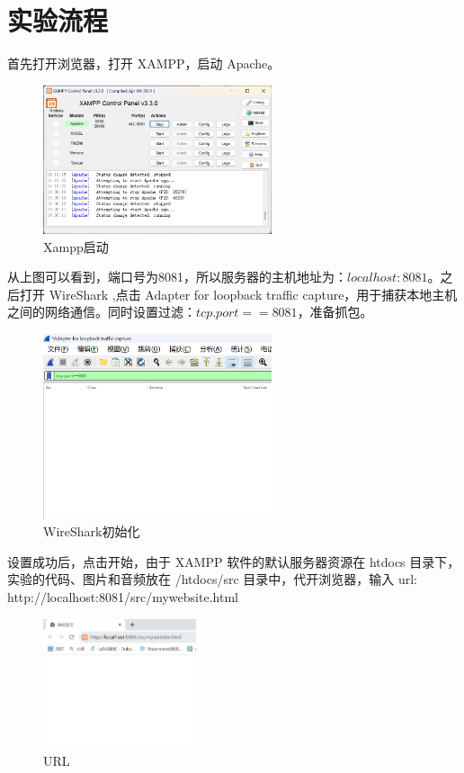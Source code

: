 \documentclass[UTF8,a4paper,10pt]{ctexart}
\begin{document}
\section{实验流程}
首先打开浏览器，打开 XAMPP，启动 Apache。
\begin{figure}[H]
    \centering
\includegraphics[width=0.6\textwidth]{img/Xampp启动.png}
    \caption{Xampp启动}
\end{figure}
从上图可以看到，端口号为8081，所以服务器的主机地址为：$localhost:8081$。之后打开 WireShark ,点击 Adapter for loopback traffic capture，用于捕获本地主机之间的网络通信。同时设置过滤：$tcp.port==8081$，准备抓包。
\begin{figure}[H]
    \centering
\includegraphics[width=0.6\textwidth]{img/WireShark初始化.png}
    \caption{WireShark初始化}
\end{figure}
设置成功后，点击开始，由于 XAMPP 软件的默认服务器资源在 htdocs 目录下，实验的代码、图片和音频放在 /htdocs/src 目录中，代开浏览器，输入 url: http://localhost:8081/src/mywebsite.html
\begin{figure}[H]
    \centering
\includegraphics[width=0.4\textwidth]{img/URL.png}
    \caption{URL}
\end{figure}
\end{document}
